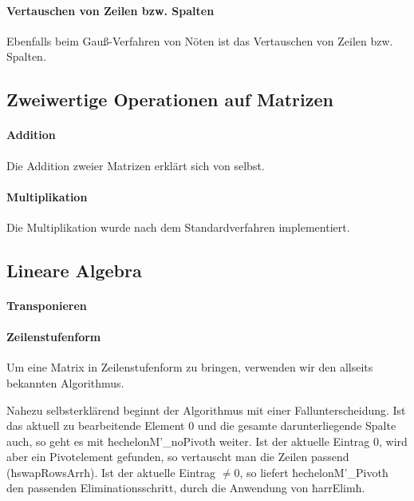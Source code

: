 \paragraph{Vertauschen von Zeilen bzw. Spalten} Ebenfalls beim Gauß-Verfahren
von Nöten ist das Vertauschen von Zeilen bzw. Spalten.



\subsection{Zweiwertige Operationen auf Matrizen}

\paragraph{Addition} Die Addition zweier Matrizen erklärt sich von selbst.


\paragraph{Multiplikation} Die Multiplikation wurde nach dem Standardverfahren
implementiert.


\subsection{Lineare Algebra}

\paragraph{Transponieren} 


\paragraph{Zeilenstufenform} 
Um eine Matrix in Zeilenstufenform zu bringen, verwenden wir den allseits
bekannten Algorithmus.


Nahezu selbsterklärend beginnt der Algorithmus mit einer Fallunterscheidung.
Ist das aktuell zu bearbeitende Element $0$ und die gesamte darunterliegende
Spalte auch, so geht es mit ħechelonM'_noPivotħ weiter. Ist der aktuelle 
Eintrag $0$, wird aber ein Pivotelement gefunden, so vertauscht man die Zeilen
passend (ħswapRowsArrħ). Ist der aktuelle Eintrag $\neq 0$, so liefert 
ħechelonM'_Pivotħ den passenden Eliminationsschritt, durch die Anwendung von
ħarrElimħ.

